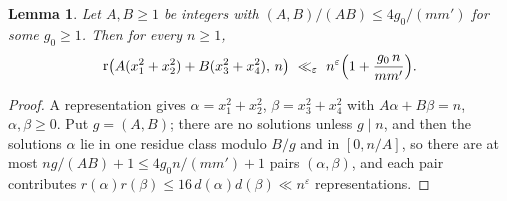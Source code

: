 \documentclass[11pt]{amsart}
\newtheorem{lemma}[theorem]{Lemma}
\theoremstyle{remark}
\newcommand{\e}{\varepsilon}
\DeclareMathOperator{\rk}{r}
\begin{document}
\begin{lemma}\label{lem:count}
Let $A,B\ge1$ be integers with $(A,B)/(AB)\le4g_0/(mm')$ for some $g_0\ge1$. Then for every $n\ge1$,
\[
\rk\bigl(A(x_1^2+x_2^2)+B(x_3^2+x_4^2),\,n\bigr)\ \ll_\e\ n^{\e}\Bigl(1+\frac{g_0\,n}{mm'}\Bigr).
\]
\end{lemma}
\begin{proof}
A representation gives $\alpha=x_1^2+x_2^2$, $\beta=x_3^2+x_4^2$ with $A\alpha+B\beta=n$, $\alpha,\beta\ge0$. Put $g=(A,B)$; there are no solutions unless $g\mid n$, and then the solutions $\alpha$ lie in one residue class modulo $B/g$ and in $[0,n/A]$, so there are at most $ng/(AB)+1\le4g_0n/(mm')+1$ pairs $(\alpha,\beta)$, and each pair contributes $r(\alpha)r(\beta)\le16\,d(\alpha)d(\beta)\ll n^\e$ representations.
\end{proof}
\end{document}
